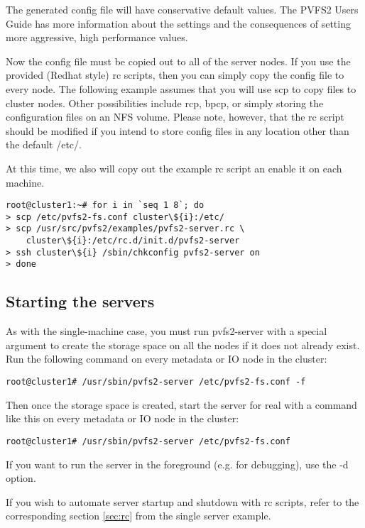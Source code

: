 \documentclass[11pt, letterpaper]{article}
\begin{document}
The generated config file will have conservative default values.  The PVFS2
Users Guide has more information about the settings and the consequences of
setting more aggressive, high performance values.

Now the config file must be copied out to all of the server nodes.  If you 
use the provided (Redhat style) rc scripts, then you can simply copy
the config file to every node.  The following example assumes
that you will use scp to copy files to cluster nodes.  Other possibilities
include rcp, bpcp, or simply storing the configuration files on an NFS volume.
Please note, however, that the rc script should be modified if you intend
to store config files in any location other than the default /etc/.

At this time, we also will copy out the example rc script an enable it on
each machine.

\begin{verbatim}
root@cluster1:~# for i in `seq 1 8`; do
> scp /etc/pvfs2-fs.conf cluster\${i}:/etc/
> scp /usr/src/pvfs2/examples/pvfs2-server.rc \
    cluster\${i}:/etc/rc.d/init.d/pvfs2-server
> ssh cluster\${i} /sbin/chkconfig pvfs2-server on
> done
\end{verbatim}

\subsection{Starting the servers}

As with the single-machine case, you must run pvfs2-server with a
special argument to create the storage space on all the nodes if it
does not already exist.  Run the following command on every metadata
or IO node in the cluster:

\begin{verbatim}
root@cluster1# /usr/sbin/pvfs2-server /etc/pvfs2-fs.conf -f
\end{verbatim}

Then once the storage space is created, start the server for real with a
command like this on every metadata or IO node in the cluster:

\begin{verbatim}
root@cluster1# /usr/sbin/pvfs2-server /etc/pvfs2-fs.conf 
\end{verbatim}

If you want to run the server in the foreground (e.g. for debugging), use the
-d option.

If you wish to automate server startup and shutdown with rc scripts, refer
to the corresponding section \ref{sec:rc} from the single server example.
\end{document}
